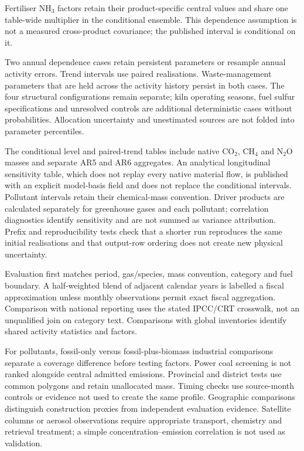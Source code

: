 \documentclass[essd]{copernicus}
\begin{document}
Fertiliser NH$_3$ factors retain their product-specific central values and share one table-wide multiplier in the conditional ensemble. This dependence assumption is not a measured cross-product covariance; the published interval is conditional on it.

Two annual dependence cases retain persistent parameters or resample annual activity errors. Trend intervals use paired realisations. Waste-management parameters that are held across the activity history persist in both cases. The four structural configurations remain separate; kiln operating seasons, fuel sulfur specifications and unresolved controls are additional deterministic cases without probabilities. Allocation uncertainty and unestimated sources are not folded into parameter percentiles.

The conditional level and paired-trend tables include native CO$_2$, CH$_4$ and N$_2$O masses and separate AR5 and AR6 aggregates. An analytical longitudinal sensitivity table, which does not replay every native material flow, is published with an explicit model-basis field and does not replace the conditional intervals. Pollutant intervals retain their chemical-mass convention. Driver products are calculated separately for greenhouse gases and each pollutant; correlation diagnostics identify sensitivity and are not summed as variance attribution. Prefix and reproducibility tests check that a shorter run reproduces the same initial realisations and that output-row ordering does not create new physical uncertainty.

Evaluation first matches period, gas/species, mass convention, category and fuel boundary. A half-weighted blend of adjacent calendar years is labelled a fiscal approximation unless monthly observations permit exact fiscal aggregation. Comparison with national reporting uses the stated IPCC/CRT crosswalk, not an unqualified join on category text. Comparisons with global inventories identify shared activity statistics and factors.

For pollutants, fossil-only versus fossil-plus-biomass industrial comparisons separate a coverage difference before testing factors. Power coal screening is not ranked alongside central admitted emissions. Provincial and district tests use common polygons and retain unallocated mass. Timing checks use source-month controls or evidence not used to create the same profile. Geographic comparisons distinguish construction proxies from independent evaluation evidence. Satellite columns or aerosol observations require appropriate transport, chemistry and retrieval treatment; a simple concentration--emission correlation is not used as validation.
\end{document}
